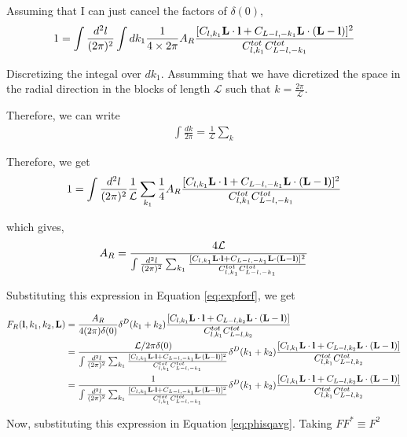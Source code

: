 \documentclass[12pt]{article}
\newcommand{\beq}{\begin{equation}}
\newcommand{\eeq}{\end{equation}}
\newcommand{\beqa}{\begin{eqnarray}}
\newcommand{\eeqa}{\end{eqnarray}}
\newcommand{\beqal}{\begin{aligned}}
\newcommand{\eeqal}{\end{aligned}}
\def\l{{\bf l}}
\def\L{{\bf L}}
\def\d2l{\frac{d^2l}{(2\pi)^2}}
\numberwithin{equation}{section}
\begin{document}
Assuming that I can just cancel the factors of $ \delta(0) $, 
\beq
\beqal
1 = \int \d2l \int dk_1 \frac{1}{4\times2\pi} A_R \frac{[C_{l,k_1} \L\cdot \l +
	C_{L-l,-k_1} \L\cdot (\L-\l)]^2}{C^{tot}_{l,k_1}C^{tot}_{L-l,-k_1}} 
\eeqal
\eeq

Discretizing the integal over $ dk_1 $. Assumming that we have dicretized the space in the radial direction in the blocks of length $ \mathcal{L} $ such that $ k = \frac{2\pi}{\mathcal{L}} $.

Therefore, we can write 
\beqa
\int \frac{dk}{2 \pi} = \frac{1}{\mathcal{L}} \sum_k
\eeqa

Therefore, we get
\beqa
1 = \int \d2l \frac{1}{\mathcal{L}} \sum_{k_1} \frac{1}{4} A_R \frac{[C_{l,k_1} \L\cdot \l +
	C_{L-l,-k_1} \L\cdot (\L-\l)]^2}{C^{tot}_{l,k_1}C^{tot}_{L-l,-k_1}} 
\eeqa

which gives, 
\beqa
A_R = \frac{4 \mathcal{L}}{\int \frac{d^2 l}{(2\pi)^2} \sum_{k_1} \frac{[C_{l,k_1} \L\cdot \l +
		C_{L-l,-k_1} \L\cdot (\L-\l)]^2}{C^{tot}_{l,k_1}C^{tot}_{L-l,-k_1}} }  
\eeqa

%

Substituting this expression in Equation \ref{eq:expforf}, we get

\beq
\beqal
F_R(\l,k_1,k_2,\L) &= \frac{A_R }{4 (2\pi) \delta(0) }\delta^D(k_1+k_2) \frac{[C_{l,k_1} \L\cdot \l +
	C_{L-l,k_2} \L\cdot (\L-\l)]}{C^{tot}_{l,k_1}C^{tot}_{L-l,k_2}}
\\
&=  \frac{\mathcal{L} / 2\pi \delta(0)}{\int \frac{d^2 l}{(2\pi)^2} \sum_{k_1} \frac{[C_{l,k_1} \L\cdot \l +
		C_{L-l,-k_1} \L\cdot (\L-\l)]^2}{C^{tot}_{l,k_1}C^{tot}_{L-l,-k_1}} }   \delta^D(k_1+k_2) \frac{[C_{l,k_1} \L\cdot \l +
	C_{L-l,k_2} \L\cdot (\L-\l)]}{C^{tot}_{l,k_1}C^{tot}_{L-l,k_2}}\\
&=  \frac{1}{\int \frac{d^2 l}{(2\pi)^2} \sum_{k_1} \frac{[C_{l,k_1} \L\cdot \l +
		C_{L-l,-k_1} \L\cdot (\L-\l)]^2}{C^{tot}_{l,k_1}C^{tot}_{L-l,-k_1}} }   \delta^D(k_1+k_2) \frac{[C_{l,k_1} \L\cdot \l +
	C_{L-l,k_2} \L\cdot (\L-\l)]}{C^{tot}_{l,k_1}C^{tot}_{L-l,k_2}}
\eeqal
\eeq

Now, substituting this expression in Equation \ref{eq:phisqavg}. Taking $ FF^* \equiv F^2 $
\end{document}

